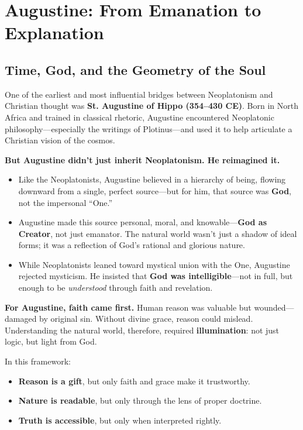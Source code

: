\section{Augustine: From Emanation to Explanation}

\subsection{Time, God, and the Geometry of the Soul}

One of the earliest and most influential bridges between Neoplatonism and Christian thought was \textbf{St. Augustine of Hippo (354–430 CE)}. Born in North Africa and trained in classical rhetoric, Augustine encountered Neoplatonic philosophy—especially the writings of Plotinus—and used it to help articulate a Christian vision of the cosmos.

\textbf{But Augustine didn’t just inherit Neoplatonism. He reimagined it.}

\begin{itemize}
  \item Like the Neoplatonists, Augustine believed in a hierarchy of being, flowing downward from a single, perfect source—but for him, that source was \textbf{God}, not the impersonal “One.”
  \item Augustine made this source personal, moral, and knowable—\textbf{God as Creator}, not just emanator. The natural world wasn’t just a shadow of ideal forms; it was a reflection of God’s rational and glorious nature.
  \item While Neoplatonists leaned toward mystical union with the One, Augustine rejected mysticism. He insisted that \textbf{God was intelligible}—not in full, but enough to be \emph{understood} through faith and revelation.
\end{itemize}

\textbf{For Augustine, faith came first.} Human reason was valuable but wounded—damaged by original sin. Without divine grace, reason could mislead. Understanding the natural world, therefore, required \textbf{illumination}: not just logic, but light from God.

In this framework:

\begin{itemize}
  \item \textbf{Reason is a gift}, but only faith and grace make it trustworthy.
  \item \textbf{Nature is readable}, but only through the lens of proper doctrine.
  \item \textbf{Truth is accessible}, but only when interpreted rightly.
\end{itemize}

